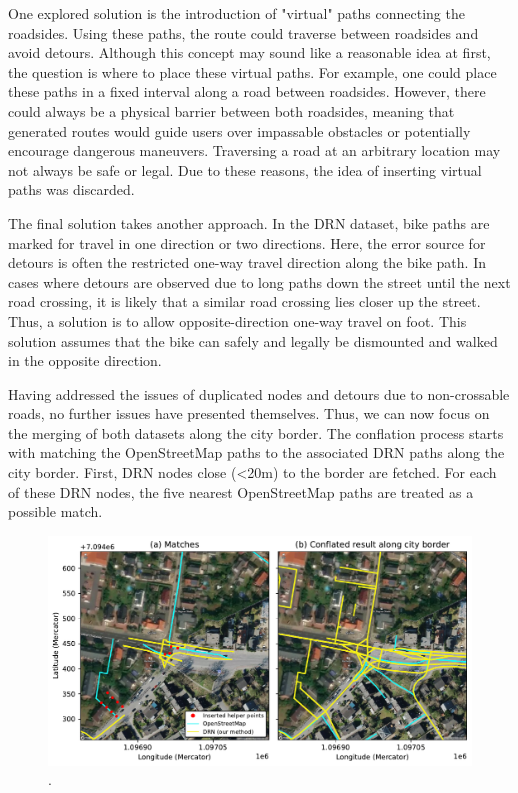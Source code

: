 One explored solution is the introduction of "virtual" paths connecting the roadsides. Using these paths, the route could traverse between roadsides and avoid detours. Although this concept may sound like a reasonable idea at first, the question is where to place these virtual paths. For example, one could place these paths in a fixed interval along a road between roadsides. However, there could always be a physical barrier between both roadsides, meaning that generated routes would guide users over impassable obstacles or potentially encourage dangerous maneuvers. Traversing a road at an arbitrary location may not always be safe or legal. Due to these reasons, the idea of inserting virtual paths was discarded.

The final solution takes another approach. In the DRN dataset, bike paths are marked for travel in one direction or two directions. Here, the error source for detours is often the restricted one-way travel direction along the bike path. In cases where detours are observed due to long paths down the street until the next road crossing, it is likely that a similar road crossing lies closer up the street. Thus, a solution is to allow opposite-direction one-way travel on foot. This solution assumes that the bike can safely and legally be dismounted and walked in the opposite direction.

Having addressed the issues of duplicated nodes and detours due to non-crossable roads, no further issues have presented themselves. Thus, we can now focus on the merging of both datasets along the city border. The conflation process starts with matching the OpenStreetMap paths to the associated DRN paths along the city border. First, DRN nodes close (<20m) to the border are fetched. For each of these DRN nodes, the five nearest OpenStreetMap paths are treated as a possible match. 

\begin{figure}[t]
\centering
\includegraphics[width=\linewidth]{images/routing-drn-osm-border.pdf}
\caption{.}
\label{fig:routing-drn-osm-border}
\end{figure}

